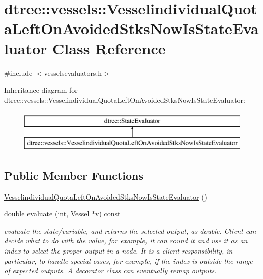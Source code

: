 \hypertarget{classdtree_1_1vessels_1_1_vesselindividual_quota_left_on_avoided_stks_now_is_state_evaluator}{}\section{dtree\+::vessels\+::Vesselindividual\+Quota\+Left\+On\+Avoided\+Stks\+Now\+Is\+State\+Evaluator Class Reference}
\label{classdtree_1_1vessels_1_1_vesselindividual_quota_left_on_avoided_stks_now_is_state_evaluator}


{\ttfamily \#include $<$vesselsevaluators.\+h$>$}

Inheritance diagram for dtree\+::vessels\+::Vesselindividual\+Quota\+Left\+On\+Avoided\+Stks\+Now\+Is\+State\+Evaluator\+:\begin{figure}[H]
\begin{center}
\leavevmode
\includegraphics[height=2.000000cm]{db/d37/classdtree_1_1vessels_1_1_vesselindividual_quota_left_on_avoided_stks_now_is_state_evaluator}
\end{center}
\end{figure}
\subsection*{Public Member Functions}
\begin{DoxyCompactItemize}
\item 
\mbox{\hyperlink{classdtree_1_1vessels_1_1_vesselindividual_quota_left_on_avoided_stks_now_is_state_evaluator_a248d84e54ae23550d9d61b07019798a7}{Vesselindividual\+Quota\+Left\+On\+Avoided\+Stks\+Now\+Is\+State\+Evaluator}} ()
\item 
double \mbox{\hyperlink{classdtree_1_1vessels_1_1_vesselindividual_quota_left_on_avoided_stks_now_is_state_evaluator_a59c422d3882dd490116154217c94a021}{evaluate}} (int, \mbox{\hyperlink{class_vessel}{Vessel}} $\ast$v) const
\begin{DoxyCompactList}\small\item\em evaluate the state/variable, and returns the selected output, as double. Client can decide what to do with the value, for example, it can round it and use it as an index to select the proper output in a node. It is a client responsibility, in particular, to handle special cases, for example, if the index is outside the range of expected outputs. A decorator class can eventually remap outputs. \end{DoxyCompactList}\end{DoxyCompactItemize}


